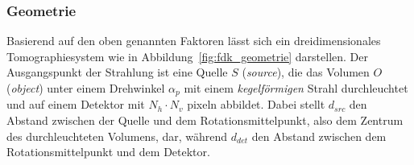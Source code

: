 \subsubsection{Geometrie}\label{sssec:fdk_geometrie}

Basierend auf den oben genannten Faktoren lässt sich ein dreidimensionales Tomographiesystem wie in
Abbildung~\ref{fig:fdk_geometrie} darstellen. Der Ausgangspunkt der Strahlung ist eine Quelle $S$ (\textit{source}), die
das Volumen $O$ (\textit{object}) unter einem Drehwinkel $\alpha_p$ mit einem \textit{kegelförmigen} Strahl
durchleuchtet und auf einem Detektor mit $N_h \cdot N_v$ \gls{pixel}n abbildet. Dabei stellt $d_{src}$ den Abstand
zwischen der Quelle und dem Rotationsmittelpunkt, also dem Zentrum des durchleuchteten Volumens, dar, während $d_{det}$
den Abstand zwischen dem Rotationsmittelpunkt und dem Detektor.

